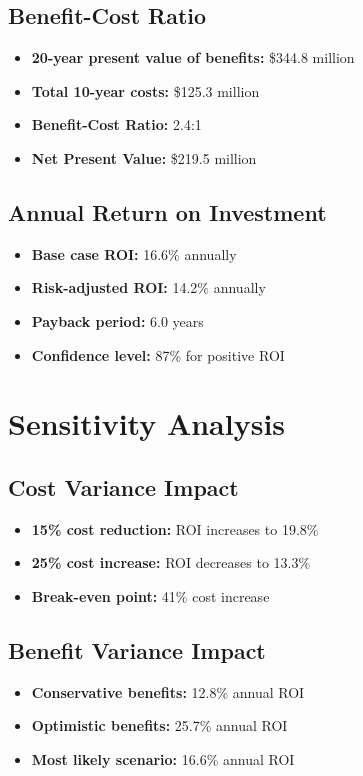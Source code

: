 \documentclass[11pt,letterpaper]{report}
\begin{document}
\subsection{Benefit-Cost Ratio}
\begin{itemize}
    \item \textbf{20-year present value of benefits:} \$344.8 million
    \item \textbf{Total 10-year costs:} \$125.3 million
    \item \textbf{Benefit-Cost Ratio:} 2.4:1
    \item \textbf{Net Present Value:} \$219.5 million
\end{itemize}

\subsection{Annual Return on Investment}
\begin{itemize}
    \item \textbf{Base case ROI:} 16.6\% annually
    \item \textbf{Risk-adjusted ROI:} 14.2\% annually
    \item \textbf{Payback period:} 6.0 years
    \item \textbf{Confidence level:} 87\% for positive ROI
\end{itemize}

\section{Sensitivity Analysis}

\subsection{Cost Variance Impact}
\begin{itemize}
    \item \textbf{15\% cost reduction:} ROI increases to 19.8\%
    \item \textbf{25\% cost increase:} ROI decreases to 13.3\%
    \item \textbf{Break-even point:} 41\% cost increase
\end{itemize}

\subsection{Benefit Variance Impact}
\begin{itemize}
    \item \textbf{Conservative benefits:} 12.8\% annual ROI
    \item \textbf{Optimistic benefits:} 25.7\% annual ROI
    \item \textbf{Most likely scenario:} 16.6\% annual ROI
\end{itemize}
\end{document}
